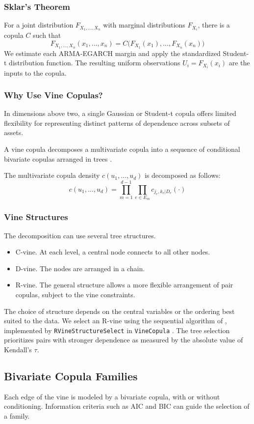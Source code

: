 \documentclass[12pt,a4paper]{article}
\begin{document}
\subsubsection{Sklar's Theorem}
For a joint distribution $F_{X_1,\dots,X_n}$ with marginal distributions $F_{X_i}$, there is a copula $C$ such that
\[
F_{X_1,\dots,X_n}(x_1,\dots,x_n) = C\big(F_{X_1}(x_1),\dots,F_{X_n}(x_n)\big)
\]
We estimate each ARMA-EGARCH margin and apply the standardized Student-t distribution function. The resulting uniform observations $U_i=F_{X_i}(x_i)$ are the inputs to the copula.

\subsubsection{Why Use Vine Copulas?}
In dimensions above two, a single Gaussian or Student-t copula offers limited flexibility for representing distinct patterns of dependence across subsets of assets.

A vine copula decomposes a multivariate copula into a sequence of conditional bivariate copulas arranged in trees \citep{bedford2002, aas2009}.

The multivariate copula density $c(u_1,\dots,u_d)$ is decomposed as follows:
\[
c(u_1,\dots,u_d) = \prod_{m=1}^{d-1} \prod_{e \in E_m} c_{j_e,k_e|D_e}(\cdot)
\]

\subsubsection{Vine Structures}
The decomposition can use several tree structures.
\begin{itemize}
  \item C-vine. At each level, a central node connects to all other nodes.
  \item D-vine. The nodes are arranged in a chain.
  \item R-vine. The general structure allows a more flexible arrangement of pair copulas, subject to the vine constraints.
\end{itemize}
The choice of structure depends on the central variables or the ordering best suited to the data.
We select an R-vine using the sequential algorithm of \citet{dissmann2013}, implemented by \texttt{RVineStructureSelect} in \texttt{VineCopula} \citep{vinecopula}. The tree selection prioritizes pairs with stronger dependence as measured by the absolute value of Kendall's $\tau$.

\subsection{Bivariate Copula Families}
Each edge of the vine is modeled by a bivariate copula, with or without conditioning. Information criteria such as AIC and BIC can guide the selection of a family.
\end{document}
